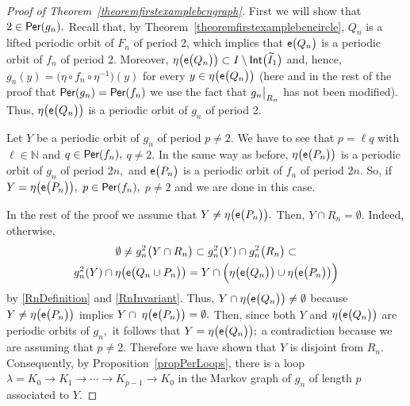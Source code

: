 \documentclass[a4paper, 11pt]{amsart}
\numberwithin{equation}{section}
\theoremstyle{customnumberedtheorem}
\theoremstyle{definitionwithbfnote}
\newcommand{\N}{\ensuremath{\mathbb{N}}}
\DeclareMathOperator{\Per}{\textsf{\upshape Per}}
\DeclareMathOperator{\Int}{\textsf{\upshape Int}}
\DeclareMathOperator{\eexp}{\textsf{\upshape e}}
\newcommand{\bigemap}[1]{\ensuremath{\eexp\bigl(#1\bigr)}}
\newcommand{\bigeta}[1]{\ensuremath{\eta\bigl(#1\bigr)}}
\newcommand{\evalat}[1]{\bigr\rvert\sb{#1}}
\begin{document}
\begin{proof}[Proof of Theorem~\ref{theoremfirstexamplebcngraph}]
First we will show that $2 \in \Per(g_n).$
Recall that, by Theorem~\ref{theoremfirstexamplebcncircle}, $Q_n$
is a lifted periodic orbit of $F_n$ of period 2, which implies that
$\bigemap{Q_n}$ is a periodic orbit of $f_n$ of period 2.
Moreover, $\bigeta{\bigemap{Q_n}} \subset I\setminus\Int\bigl(\widetilde{I}_1\bigr)$
and, hence,
$g_n(y) = \bigl(\eta \circ f_n \circ \eta^{-1}\bigr)(y)$
for every $y \in \bigeta{\bigemap{Q_n}}$
(here and in the rest of the proof that $\Per(g_n) = \Per(f_n)$
we use the fact that $g_n\evalat{R_n}$ has not been modified).
Thus, $\bigeta{\bigemap{Q_n}}$ is a periodic orbit of $g_n$ of period 2.

Let $Y$ be a periodic orbit of $g_n$ of period $p \ne 2$.
We have to see that
$p = \ell q$ with $\ell \in \N$ and
$q\in\Per(f_n),$ $q \ne 2.$
In the same way as before,
$\bigeta{\bigemap{P_n}}$ is a periodic orbit of $g_n$ of period $2n,$
and $\bigemap{P_n}$ is a periodic orbit of $f_n$ of period $2n.$
So, if $Y = \bigeta{\bigemap{P_n}},$
$p\in\Per(f_n),$ $p \ne 2$ and we are done in this case.

In the rest of the proof we assume that
$Y \ne \bigeta{\bigemap{P_n}}.$
Then, $Y \cap R_n = \emptyset.$
Indeed, otherwise,
\begin{multline*}
 \emptyset \ne g_n^2\bigl(Y \cap R_n\bigr) \subset
 g_n^2(Y) \cap g_n^2\bigl(R_n\bigr) \subset \\
 g_n^2(Y) \cap \bigeta{\bigemap{Q_n \cup P_n}} =
 Y \cap \Bigl(\bigeta{\bigemap{Q_n}} \cup \bigeta{\bigemap{P_n}} \Bigr)
\end{multline*}
by \eqref{RnDefinition} and \eqref{RnInvariant}.
Thus, $Y \cap \bigeta{\bigemap{Q_n}}  \ne \emptyset$ because
$Y \ne \bigeta{\bigemap{P_n}}$ implies $Y \cap\; \bigeta{\bigemap{P_n}} = \emptyset.$
Then,
since both $Y$ and $\bigeta{\bigemap{Q_n}}$ are periodic orbits of $g_n,$
it follows that $Y = \bigeta{\bigemap{Q_n}};$ a contradiction because
we are assuming that $p \ne 2.$
Therefore we have shown that $Y$ is disjoint from $R_n.$
Consequently, by Proposition~\ref{propPerLoops}, there is a loop
$
\lambda = K_0\longrightarrow K_1\longrightarrow \cdots
             \longrightarrow K_{p-1}\longrightarrow K_0
$
in the Markov graph of $g_n$ of length $p$ associated to $Y.$


\end{proof}
\end{document}
